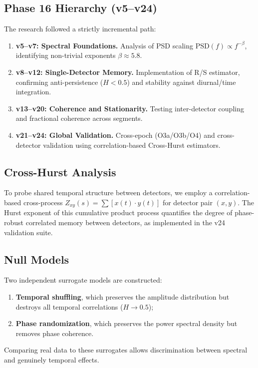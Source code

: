 \documentclass[11pt,a4paper]{article}
\begin{document}
\subsection{Phase 16 Hierarchy (v5--v24)}
The research followed a strictly incremental path:
\begin{enumerate}[leftmargin=1.5em]
    \item \textbf{v5--v7: Spectral Foundations.} Analysis of PSD scaling $\text{PSD}(f) \propto f^{-\beta}$, identifying non-trivial exponents $\beta \approx 5.8$.
    \item \textbf{v8--v12: Single-Detector Memory.} Implementation of R/S estimator, confirming anti-persistence ($H < 0.5$) and stability against diurnal/time integration.
    \item \textbf{v13--v20: Coherence and Stationarity.} Testing inter-detector coupling and fractional coherence across segments.
    \item \textbf{v21--v24: Global Validation.} Cross-epoch (O3a/O3b/O4) and cross-detector validation using correlation-based Cross-Hurst estimators.
\end{enumerate}

\subsection{Cross-Hurst Analysis}
To probe shared temporal structure between detectors, we employ a correlation-based cross-process $Z_{xy}(s) = \sum [x(t) \cdot y(t)]$ for detector pair $(x,y)$. The Hurst exponent of this cumulative product process quantifies the degree of phase-robust correlated memory between detectors, as implemented in the v24 validation suite.

\subsection{Null Models}
Two independent surrogate models are constructed:
\begin{enumerate}[leftmargin=1.5em]
\item \textbf{Temporal shuffling}, which preserves the amplitude distribution but destroys all temporal correlations ($H \rightarrow 0.5$);
\item \textbf{Phase randomization}, which preserves the power spectral density but removes phase coherence.
\end{enumerate}

Comparing real data to these surrogates allows discrimination between spectral and genuinely temporal effects.
\end{document}
